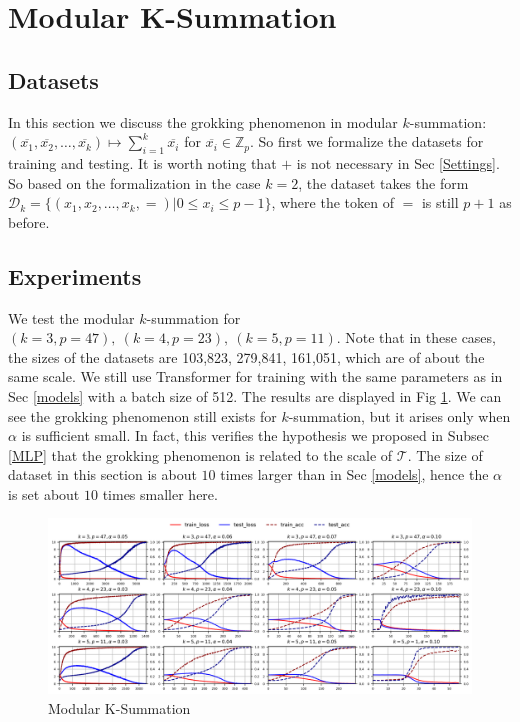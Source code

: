 \documentclass{article}
\begin{document}
\section{Modular K-Summation}

\subsection{Datasets}

In this section we discuss the grokking phenomenon in modular $k$-summation: $\left(\overline{x_1}, \overline{x_2},\dots, \overline{x_k}\right) \mapsto \sum_{i=1}^k\overline{x_i}$ for $\overline{x_i} \in \mathbb{Z}_p$. So first we formalize the datasets for training and testing. It is worth noting that $+$ is not necessary in Sec \ref{Settings}. So based on the formalization in the case $k=2$, the dataset takes the form $\mathcal{D}_k = \lbrace \left(x_1, x_2,\dots, x_k, =\right)\left.\right| 0 \leqslant x_i \leqslant p-1\rbrace$, where the token of $=$ is still $p+1$ as before.

\subsection{Experiments}

We test the modular $k$-summation for $(k = 3, p = 47),\ (k = 4, p = 23),\ (k = 5, p = 11)$. Note that in these cases, the sizes of the datasets are 103,823, 279,841, 161,051, which are of about the same scale. We still use Transformer for training with the same parameters as in Sec \ref{models} with a batch size of 512. The results are displayed in Fig \ref{ksum}. We can see the grokking phenomenon still exists for $k$-summation, but it arises only when $\alpha$ is sufficient small. In fact, this verifies the hypothesis we proposed in Subsec \ref{MLP} that the grokking phenomenon is related to the scale of $\mathcal{T}$. The size of dataset in this section is about $10$ times larger than in Sec \ref{models}, hence the $\alpha$ is set about $10$ times smaller here. 

\begin{figure}[htbp]
  \centering
  \includegraphics[width=\textwidth]{./pic/ksum.png}
  \caption{Modular K-Summation}
  \label{ksum}
\end{figure}
\end{document}
